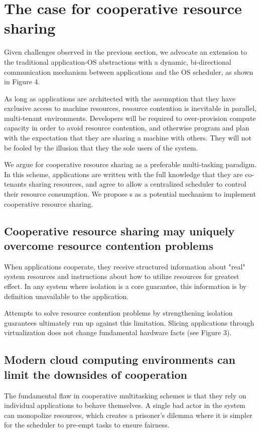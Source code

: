 \section{The case for cooperative resource sharing}



Given challenges observed in the previous section, we advocate an extension to the traditional application-OS abstractions with a dynamic, bi-directional communication mechanism between applications and the OS scheduler, as shown in Figure 4. 

As long as applications are architected with the assumption that they have exclusive access to machine resources, resource contention is inevitable in parallel, multi-tenant environments. Developers will be required to over-provision compute capacity in order to avoid resource contention, and otherwise program and plan with the expectation that they are sharing a machine with others. They will not be fooled by the illusion that they the sole users of the system.

We argue for cooperative resource sharing as a preferable multi-tasking paradigm. In this scheme, applications are written with the full knowledge that they are co-tenants sharing resources, and agree to allow a centralized scheduler to control their resource consumption. We propose \mechfull{}s as a potential mechanism to implement cooperative resource sharing.

\subsection{Cooperative resource sharing may uniquely overcome resource contention problems}
When applications cooperate, they receive structured information about "real" system resources and instructions about how to utilize resources for greatest effect. In any system where isolation is a core guarantee, this information is by definition unavailable to the application.

Attempts to solve resource contention problems by strengthening isolation guarantees ultimately run up against this limitation. Slicing applications through virtualization does not change fundamental hardware facts (see Figure 3). 

\subsection{Modern cloud computing environments can limit the downsides of cooperation}
The fundamental flaw in cooperative multitasking schemes is that they rely on individual applications to behave themselves. A single bad actor in the system can monopolize resources, which creates a prisoner's dilemma where it is simpler for the scheduler to pre-empt tasks to ensure fairness.

